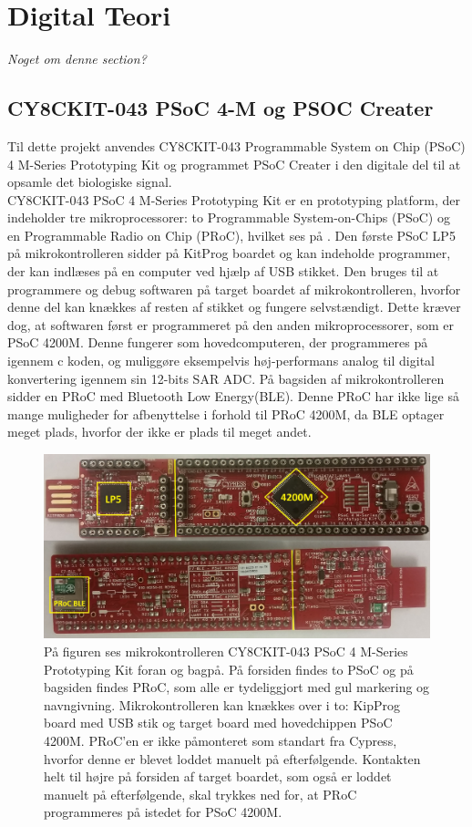 \section{Digital Teori}
\textit{Noget om denne section?}

\subsection{CY8CKIT-043 PSoC 4-M og PSOC Creater}
Til dette projekt anvendes CY8CKIT-043 Programmable System on Chip (PSoC) 4 M-Series Prototyping Kit og programmet PSoC Creater i den digitale del til at opsamle det biologiske signal.\\
CY8CKIT-043 PSoC 4 M-Series Prototyping Kit er en prototyping platform, der indeholder tre mikroprocessorer: to Programmable System-on-Chips (PSoC) og en Programmable Radio on Chip (PRoC), hvilket ses på . Den første PSoC LP5 på mikrokontrolleren sidder på KitProg boardet og kan indeholde programmer, der kan indlæses på en computer ved hjælp af USB stikket. Den bruges til at programmere og debug softwaren på target boardet af mikrokontrolleren, hvorfor denne del kan knækkes af resten af stikket og fungere selvstændigt. Dette kræver dog, at softwaren først er programmeret på den anden mikroprocessorer, som er PSoC 4200M. Denne fungerer som hovedcomputeren, der programmeres på igennem c koden, og muliggøre eksempelvis høj-performans analog til digital konvertering igennem sin 12-bits SAR ADC. På bagsiden af mikrokontrolleren sidder en PRoC med Bluetooth Low Energy(BLE). Denne PRoC har ikke lige så mange muligheder for afbenyttelse i forhold til PRoC 4200M, da BLE optager meget plads, hvorfor der ikke er plads til meget andet. \citep{CYPRESS2016PSoC,Semiconductor2016,CYPRESS2016Cortexm0}
\begin{figure}[H]
	\centering
	\includegraphics[scale=0.15]{figures/bProblemloesning/PSoC3.jpg}
	\caption{På figuren ses mikrokontrolleren CY8CKIT-043 PSoC 4 M-Series Prototyping Kit foran og bagpå. På forsiden findes to PSoC og på bagsiden findes PRoC, som alle er tydeliggjort med gul markering og navngivning. Mikrokontrolleren kan knækkes over i to: KipProg board med USB stik og target board med hovedchippen PSoC 4200M. PRoC'en er ikke påmonteret som standart fra Cypress, hvorfor denne er blevet loddet manuelt på efterfølgende. Kontakten helt til højre på forsiden af target boardet, som også er loddet manuelt på efterfølgende, skal trykkes ned for, at PRoC programmeres på istedet for PSoC 4200M. \citep{CYPRESS2016PSoC,Semiconductor2016}}
	\label{fig:PSoC}
\end{figure}
